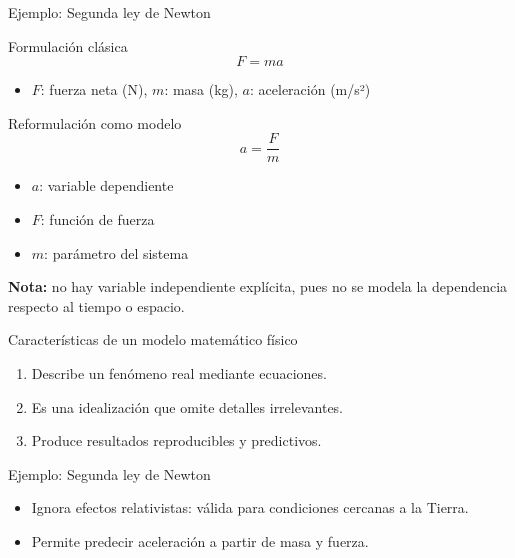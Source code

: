 \documentclass[main.tex]{subfiles}
\begin{document}
\begin{frame}{Ejemplo: Segunda ley de Newton} 
\footnotesize 
\begin{block}{Formulación clásica} \[ F = ma \] 
\begin{itemize}
\item \(F\): fuerza neta (N), \(m\): masa (kg), \(a\): aceleración (m/s²) \end{itemize}
\end{block}
\begin{block}{Reformulación como modelo}
\[ a = \frac{F}{m} \]
\begin{itemize}
\item \(a\): variable dependiente 
\item \(F\): función de fuerza 
\item \(m\): parámetro del sistema 
\end{itemize} 
\end{block} 
\textbf{Nota:} no hay variable independiente explícita, pues no se modela la dependencia respecto al tiempo o espacio.
\end{frame}

\begin{frame}[c]{Características de un modelo matemático físico}
\begin{enumerate}
  \item Describe un fenómeno real mediante ecuaciones.
  \item Es una idealización que omite detalles irrelevantes.
  \item Produce resultados reproducibles y predictivos.
\end{enumerate}

\begin{block}{Ejemplo: Segunda ley de Newton}
\begin{itemize}
  \item Ignora efectos relativistas: válida para condiciones cercanas a la Tierra.
  \item Permite predecir aceleración a partir de masa y fuerza.
\end{itemize}
\end{block}
\end{frame}
\end{document}
